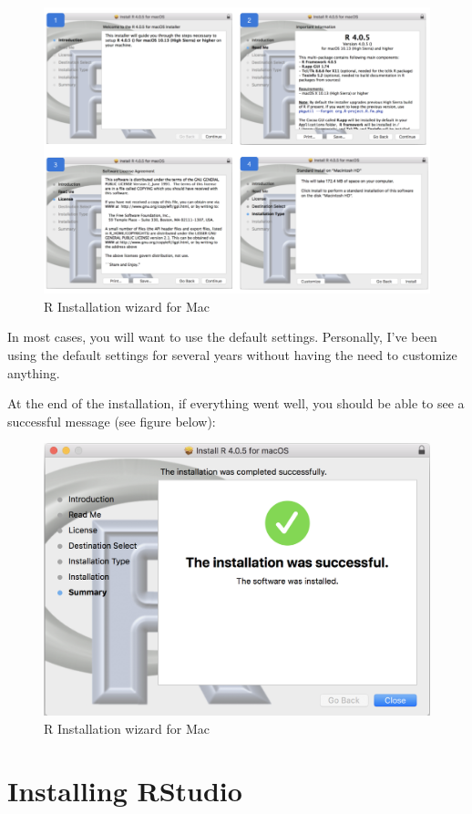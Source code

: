 \documentclass[
]{book}
\begin{document}
\begin{figure}

{\centering \includegraphics[width=0.9\linewidth]{images/install/R-install-steps} 

}

\caption{R Installation wizard for Mac}\label{fig:unnamed-chunk-8}
\end{figure}

In most cases, you will want to use the default settings. Personally, I've been
using the default settings for several years without having the need to
customize anything.

At the end of the installation, if everything went well, you should be able
to see a successful message (see figure below):

\begin{figure}

{\centering \includegraphics[width=0.5\linewidth]{images/install/install-5} 

}

\caption{R Installation wizard for Mac}\label{fig:unnamed-chunk-9}
\end{figure}

\hypertarget{installing-rstudio}{%
\section{Installing RStudio}\label{installing-rstudio}}
\end{document}
